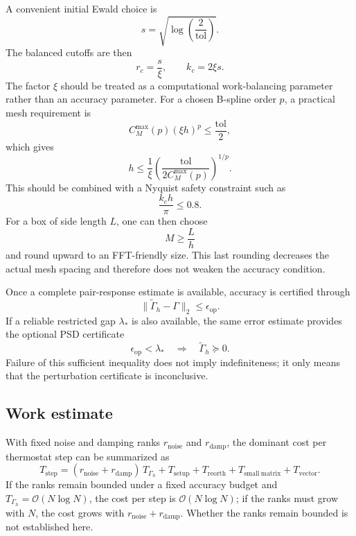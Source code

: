 \documentclass[11pt]{article}
\theoremstyle{plain}
\DeclareRobustCommand{\_}{\textunderscore\allowbreak}
\begin{document}
A convenient initial Ewald choice is
\begin{equation}
s
=
\sqrt{\log\left(\frac{2}{\mathrm{tol}}\right)}.
\end{equation}
The balanced cutoffs are then
\begin{equation}
r_c=\frac{s}{\xi},
\qquad
k_c=2\xi s.
\end{equation}
The factor $\xi$ should be treated as a computational work-balancing
parameter rather than an accuracy parameter. For a chosen B-spline order
$p$, a practical mesh requirement is
\begin{equation}
C_M^{\max}(p)(\xi h)^p
\le
\frac{\mathrm{tol}}{2},
\end{equation}
which gives
\begin{equation}
h
\le
\frac1\xi
\left(
\frac{\mathrm{tol}}
{2C_M^{\max}(p)}
\right)^{1/p}.
\end{equation}
This should be combined with a Nyquist safety constraint such as
\begin{equation}
\frac{k_ch}{\pi}\le0.8.
\end{equation}
For a box of side length $L$, one can then choose
\begin{equation}
M
\ge
\frac{L}{h}
\end{equation}
and round upward to an FFT-friendly size. This last rounding decreases the
actual mesh spacing and therefore does not weaken the accuracy condition.

Once a complete pair-response estimate is available, accuracy is certified
through
\begin{equation}
\|\widetilde\Gamma_h-\Gamma\|_2
\le
\epsilon_{\mathrm{op}}.
\end{equation}
If a reliable restricted gap $\lambda_*$ is also available, the same error
estimate provides the optional PSD certificate
\begin{equation}
\epsilon_{\mathrm{op}}<\lambda_*
\quad\Longrightarrow\quad
\widetilde\Gamma_h\succeq0.
\end{equation}
Failure of this sufficient inequality does not imply indefiniteness; it only
means that the perturbation certificate is inconclusive.

\subsection{Work estimate}

With fixed noise and damping ranks $r_{\mathrm{noise}}$ and
$r_{\mathrm{damp}}$, the dominant cost per thermostat step can be summarized as
\begin{equation}
T_{\mathrm{step}}
=
(r_{\mathrm{noise}}+r_{\mathrm{damp}})\,T_{\Gamma_h}
+
T_{\mathrm{setup}}
+
T_{\mathrm{reorth}}
+
T_{\mathrm{small\ matrix}}
+
T_{\mathrm{vector}}.
\end{equation}
If the ranks remain bounded under a fixed accuracy budget and
$T_{\Gamma_h}=\mathcal O(N\log N)$, the cost per step is
$\mathcal O(N\log N)$; if the ranks must grow with $N$, the cost grows with
$r_{\mathrm{noise}}+r_{\mathrm{damp}}$. Whether the ranks remain bounded is
not established here.
\end{document}
